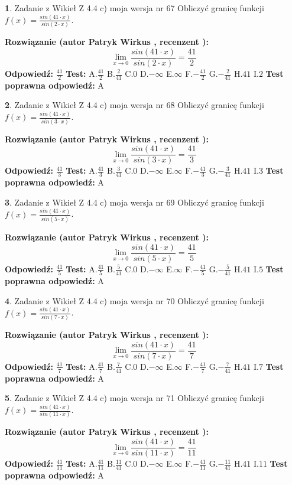 \documentclass[12pt, a4paper]{article}
\theoremstyle{definition} %
\newtheorem{zad}{}
\newcommand{\zadStart}[1]{\begin{zad}#1\newline}
\newcommand{\zadStop}{\end{zad}}
\newcommand{\rozwStart}[2]{\noindent \textbf{Rozwiązanie (autor #1 , recenzent #2): }\newline}
\newcommand{\rozwStop}{\newline}
\newcommand{\odpStart}{\noindent \textbf{Odpowiedź:}\newline}
\newcommand{\odpStop}{\newline}
\newcommand{\testStart}{\noindent \textbf{Test:}\newline}
\newcommand{\testStop}{\newline}
\newcommand{\kluczStart}{\noindent \textbf{Test poprawna odpowiedź:}\newline}
\newcommand{\kluczStop}{\newline}
\begin{document}
\zadStart{Zadanie z Wikieł Z 4.4 c) moja wersja nr 67}
Obliczyć granicę funkcji $f(x)=\frac{sin(41\cdot x)}{sin(2\cdot x)}$.
\zadStop
\rozwStart{Patryk Wirkus}{}
$$\lim\limits_{x\to 0}\frac{sin(41\cdot x)}{sin(2\cdot x)}=
\frac{41}{2}$$
\rozwStop
\odpStart
$\frac{41}{2}$
\odpStop
\testStart
A.$\frac{41}{2}$
B.$\frac{2}{41}$
C.$0$
D.$-\infty$
E.$\infty$
F.$-\frac{41}{2}$
G.$-\frac{2}{41}$
H.$41$
I.$2$
\testStop
\kluczStart
A
\kluczStop



\zadStart{Zadanie z Wikieł Z 4.4 c) moja wersja nr 68}
Obliczyć granicę funkcji $f(x)=\frac{sin(41\cdot x)}{sin(3\cdot x)}$.
\zadStop
\rozwStart{Patryk Wirkus}{}
$$\lim\limits_{x\to 0}\frac{sin(41\cdot x)}{sin(3\cdot x)}=
\frac{41}{3}$$
\rozwStop
\odpStart
$\frac{41}{3}$
\odpStop
\testStart
A.$\frac{41}{3}$
B.$\frac{3}{41}$
C.$0$
D.$-\infty$
E.$\infty$
F.$-\frac{41}{3}$
G.$-\frac{3}{41}$
H.$41$
I.$3$
\testStop
\kluczStart
A
\kluczStop



\zadStart{Zadanie z Wikieł Z 4.4 c) moja wersja nr 69}
Obliczyć granicę funkcji $f(x)=\frac{sin(41\cdot x)}{sin(5\cdot x)}$.
\zadStop
\rozwStart{Patryk Wirkus}{}
$$\lim\limits_{x\to 0}\frac{sin(41\cdot x)}{sin(5\cdot x)}=
\frac{41}{5}$$
\rozwStop
\odpStart
$\frac{41}{5}$
\odpStop
\testStart
A.$\frac{41}{5}$
B.$\frac{5}{41}$
C.$0$
D.$-\infty$
E.$\infty$
F.$-\frac{41}{5}$
G.$-\frac{5}{41}$
H.$41$
I.$5$
\testStop
\kluczStart
A
\kluczStop



\zadStart{Zadanie z Wikieł Z 4.4 c) moja wersja nr 70}
Obliczyć granicę funkcji $f(x)=\frac{sin(41\cdot x)}{sin(7\cdot x)}$.
\zadStop
\rozwStart{Patryk Wirkus}{}
$$\lim\limits_{x\to 0}\frac{sin(41\cdot x)}{sin(7\cdot x)}=
\frac{41}{7}$$
\rozwStop
\odpStart
$\frac{41}{7}$
\odpStop
\testStart
A.$\frac{41}{7}$
B.$\frac{7}{41}$
C.$0$
D.$-\infty$
E.$\infty$
F.$-\frac{41}{7}$
G.$-\frac{7}{41}$
H.$41$
I.$7$
\testStop
\kluczStart
A
\kluczStop



\zadStart{Zadanie z Wikieł Z 4.4 c) moja wersja nr 71}
Obliczyć granicę funkcji $f(x)=\frac{sin(41\cdot x)}{sin(11\cdot x)}$.
\zadStop
\rozwStart{Patryk Wirkus}{}
$$\lim\limits_{x\to 0}\frac{sin(41\cdot x)}{sin(11\cdot x)}=
\frac{41}{11}$$
\rozwStop
\odpStart
$\frac{41}{11}$
\odpStop
\testStart
A.$\frac{41}{11}$
B.$\frac{11}{41}$
C.$0$
D.$-\infty$
E.$\infty$
F.$-\frac{41}{11}$
G.$-\frac{11}{41}$
H.$41$
I.$11$
\testStop
\kluczStart
A
\kluczStop
\end{document}
